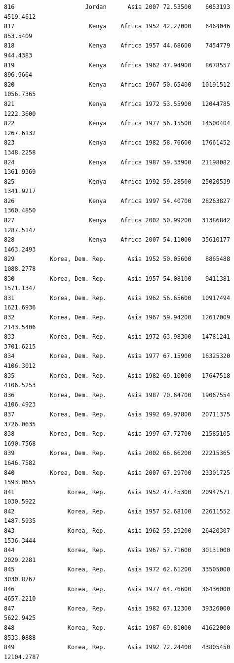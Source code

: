 \documentclass[
  letterpaper,
  DIV=11,
  numbers=noendperiod]{scrreprt}
\begin{document}
\begin{verbatim}
816                    Jordan      Asia 2007 72.53500    6053193   4519.4612
817                     Kenya    Africa 1952 42.27000    6464046    853.5409
818                     Kenya    Africa 1957 44.68600    7454779    944.4383
819                     Kenya    Africa 1962 47.94900    8678557    896.9664
820                     Kenya    Africa 1967 50.65400   10191512   1056.7365
821                     Kenya    Africa 1972 53.55900   12044785   1222.3600
822                     Kenya    Africa 1977 56.15500   14500404   1267.6132
823                     Kenya    Africa 1982 58.76600   17661452   1348.2258
824                     Kenya    Africa 1987 59.33900   21198082   1361.9369
825                     Kenya    Africa 1992 59.28500   25020539   1341.9217
826                     Kenya    Africa 1997 54.40700   28263827   1360.4850
827                     Kenya    Africa 2002 50.99200   31386842   1287.5147
828                     Kenya    Africa 2007 54.11000   35610177   1463.2493
829          Korea, Dem. Rep.      Asia 1952 50.05600    8865488   1088.2778
830          Korea, Dem. Rep.      Asia 1957 54.08100    9411381   1571.1347
831          Korea, Dem. Rep.      Asia 1962 56.65600   10917494   1621.6936
832          Korea, Dem. Rep.      Asia 1967 59.94200   12617009   2143.5406
833          Korea, Dem. Rep.      Asia 1972 63.98300   14781241   3701.6215
834          Korea, Dem. Rep.      Asia 1977 67.15900   16325320   4106.3012
835          Korea, Dem. Rep.      Asia 1982 69.10000   17647518   4106.5253
836          Korea, Dem. Rep.      Asia 1987 70.64700   19067554   4106.4923
837          Korea, Dem. Rep.      Asia 1992 69.97800   20711375   3726.0635
838          Korea, Dem. Rep.      Asia 1997 67.72700   21585105   1690.7568
839          Korea, Dem. Rep.      Asia 2002 66.66200   22215365   1646.7582
840          Korea, Dem. Rep.      Asia 2007 67.29700   23301725   1593.0655
841               Korea, Rep.      Asia 1952 47.45300   20947571   1030.5922
842               Korea, Rep.      Asia 1957 52.68100   22611552   1487.5935
843               Korea, Rep.      Asia 1962 55.29200   26420307   1536.3444
844               Korea, Rep.      Asia 1967 57.71600   30131000   2029.2281
845               Korea, Rep.      Asia 1972 62.61200   33505000   3030.8767
846               Korea, Rep.      Asia 1977 64.76600   36436000   4657.2210
847               Korea, Rep.      Asia 1982 67.12300   39326000   5622.9425
848               Korea, Rep.      Asia 1987 69.81000   41622000   8533.0888
849               Korea, Rep.      Asia 1992 72.24400   43805450  12104.2787

\end{verbatim}
\end{document}
